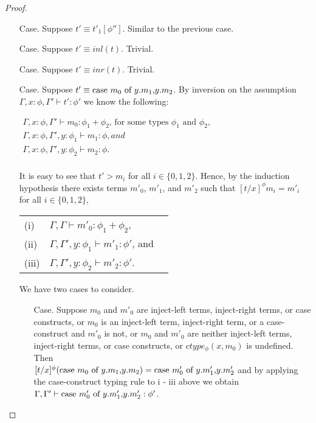 \begin{proof}
\begin{itemize}
\item[Case.] Suppose $t' \equiv t'_1[\phi'']$. Similar to the previous case.  
  
\item[Case.] Suppose $t' \equiv inl(t)$. Trivial.
  
\item[Case.] Suppose $t' \equiv inr(t)$. Trivial.
  
\item[Case.] Suppose $t' \equiv \mbox{case}\ m_0\ \text{of}\ y\text{.}m_1\text{,}y\text{.}m_2$. By inversion on the assumption
  $\Gamma,x:\phi,\Gamma' \vdash t':\phi'$ we know the following:
  \begin{center}
    \begin{math}
      \begin{array}{lll}
        \Gamma,x:\phi,\Gamma' \vdash m_0:\phi_1+\phi_2 \text{, for some types } \phi_1 \text{ and } \phi_2,\\
        \Gamma,x:\phi,\Gamma',y:\phi_1 \vdash m_1:\phi, and\\
        \Gamma,x:\phi,\Gamma',y:\phi_2 \vdash m_2:\phi.\\
      \end{array}
    \end{math}
  \end{center}
  It is easy to see that
  $t' > m_i$ for all $i \in \{0,1,2\}$.  Hence, by the induction hypothesis
  there exists terms $m'_0$, $m'_1$, and $m'_2$ such that $[t/x]^\phi m_i = m'_i$ for all $i \in \{0,1,2\}$,
  \begin{center}
    \begin{tabular}{lll}
      (i)   & $\Gamma,\Gamma \vdash m'_0:\phi_1+\phi_2$,  \\
      (ii)  & $\Gamma,\Gamma',y:\phi_1 \vdash m'_1:\phi'$, and\\
      (iii) & $\Gamma,\Gamma',y:\phi_2 \vdash m'_2:\phi'$.  
    \end{tabular}
  \end{center}
  We have two cases to consider.
  \begin{itemize}
  \item[Case.] Suppose $m_0$ and $m'_0$ are inject-left terms, inject-right terms, or case constructs,
    or $m_0$ is an inject-left term, inject-right term, or a case-construct and $m'_0$ is not, or
    $m_0$ and $m'_0$ are neither inject-left terms, inject-right terms, or case constructs, or
    $ctype_\phi(x,m_0)$ is undefined.
    Then \\
    $[t/x]^{\phi} (\mbox{case}\ m_0\ \text{of}\ y\text{.}m_1\text{,}y\text{.}m_2) = \mbox{case}\ m'_0\ \text{of}\ y\text{.}m'_1\text{,}y\text{.}m'_2$ and by applying the case-construct 
    typing rule to i - iii above we obtain $\Gamma,\Gamma' \vdash \mbox{case}\ m'_0\ \text{of}\ y\text{.}m'_1\text{,}y\text{.}m'_2:\phi'$.
    

\end{itemize}
\end{itemize}
\end{proof}
